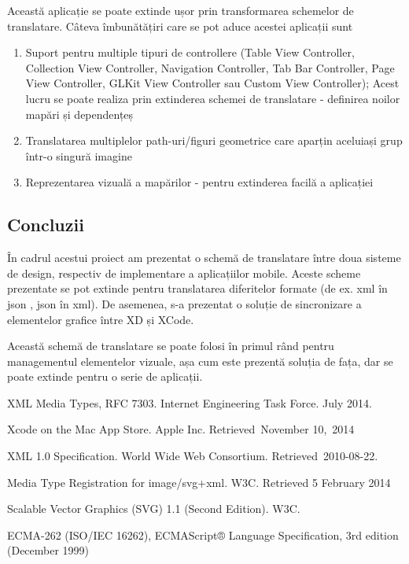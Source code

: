 Această aplicație se poate extinde ușor prin transformarea schemelor de translatare.
Câteva îmbunătățiri care se pot aduce acestei aplicații sunt 

\begin{enumerate}
\item Suport pentru multiple tipuri de controllere (Table View Controller, Collection View Controller, Navigation Controller, Tab Bar Controller, Page View Controller, GLKit View Controller sau Custom View Controller); Acest lucru se poate realiza prin extinderea schemei de translatare - definirea noilor mapări și dependențeș
\item Translatarea multiplelor path-uri/figuri geometrice care aparțin aceluiași grup într-o singură imagine 
\item Reprezentarea vizuală a mapărilor - pentru extinderea facilă a aplicației
\end{enumerate}
\subsection{Concluzii}

În cadrul acestui proiect am prezentat o schemă de translatare între doua sisteme de design, respectiv de implementare a aplicațiilor mobile. Aceste scheme prezentate se pot extinde pentru translatarea diferitelor formate (de ex. xml în json , json în xml). De asemenea, s-a prezentat o soluție de sincronizare a elementelor grafice între XD și XCode.

Această schemă de translatare se poate folosi în primul rând pentru managementul elementelor vizuale, așa cum este prezentă soluția de fața, dar se poate extinde pentru o serie de aplicații.


\begin{thebibliography}{9}
XML Media Types, RFC 7303. Internet Engineering Task Force. July 2014.
 
Xcode on the Mac App Store. Apple Inc. Retrieved November 10, 2014
 
XML 1.0 Specification. World Wide Web Consortium. Retrieved 2010-08-22.

Media Type Registration for image/svg+xml. W3C. Retrieved 5 February 2014 

Scalable Vector Graphics (SVG) 1.1 (Second Edition). W3C.

ECMA-262 (ISO/IEC 16262), ECMAScript® Language Specification, 3rd edition (December 1999)

\end{thebibliography}

